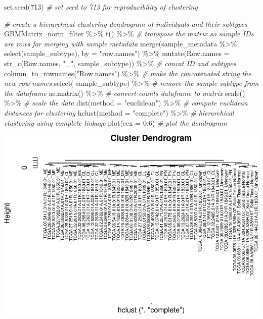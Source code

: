 \documentclass[
]{article}
\newenvironment{Shaded}{\begin{snugshade}}{\end{snugshade}}
\newcommand{\AttributeTok}[1]{\textcolor[rgb]{0.77,0.63,0.00}{#1}}
\newcommand{\CommentTok}[1]{\textcolor[rgb]{0.56,0.35,0.01}{\textit{#1}}}
\newcommand{\DecValTok}[1]{\textcolor[rgb]{0.00,0.00,0.81}{#1}}
\newcommand{\FloatTok}[1]{\textcolor[rgb]{0.00,0.00,0.81}{#1}}
\newcommand{\FunctionTok}[1]{\textcolor[rgb]{0.00,0.00,0.00}{#1}}
\newcommand{\NormalTok}[1]{#1}
\newcommand{\SpecialCharTok}[1]{\textcolor[rgb]{0.00,0.00,0.00}{#1}}
\newcommand{\StringTok}[1]{\textcolor[rgb]{0.31,0.60,0.02}{#1}}
\begin{document}
\begin{Shaded}
\begin{Highlighting}[]
\FunctionTok{set.seed}\NormalTok{(}\DecValTok{713}\NormalTok{) }\CommentTok{\# set seed to 713 for reproducibility of clustering}

\CommentTok{\# create a hierarchical clustering dendrogram of individuals and their subtypes}
\NormalTok{GBMMatrix\_norm\_filter }\SpecialCharTok{\%\textgreater{}\%} 
  \FunctionTok{t}\NormalTok{() }\SpecialCharTok{\%\textgreater{}\%} \CommentTok{\# transpose the matrix so sample IDs are rows for merging with sample metadata}
  \FunctionTok{merge}\NormalTok{(sample\_metadata }\SpecialCharTok{\%\textgreater{}\%} \FunctionTok{select}\NormalTok{(sample\_subtype), }\AttributeTok{by =} \StringTok{"row.names"}\NormalTok{) }\SpecialCharTok{\%\textgreater{}\%}
  \FunctionTok{mutate}\NormalTok{(}\AttributeTok{Row.names =} \FunctionTok{str\_c}\NormalTok{(Row.names, }\StringTok{"\_"}\NormalTok{, sample\_subtype)) }\SpecialCharTok{\%\textgreater{}\%} \CommentTok{\# concat ID and subtypes}
  \FunctionTok{column\_to\_rownames}\NormalTok{(}\StringTok{"Row.names"}\NormalTok{) }\SpecialCharTok{\%\textgreater{}\%} \CommentTok{\# make the concatenated string the new row names}
  \FunctionTok{select}\NormalTok{(}\SpecialCharTok{{-}}\NormalTok{sample\_subtype) }\SpecialCharTok{\%\textgreater{}\%} \CommentTok{\# remove the sample subtype from the dataframe}
  \FunctionTok{as.matrix}\NormalTok{() }\SpecialCharTok{\%\textgreater{}\%} \CommentTok{\# convert counts dataframe to matrix}
  \FunctionTok{scale}\NormalTok{() }\SpecialCharTok{\%\textgreater{}\%} \CommentTok{\# scale the data}
  \FunctionTok{dist}\NormalTok{(}\AttributeTok{method =} \StringTok{"euclidean"}\NormalTok{) }\SpecialCharTok{\%\textgreater{}\%} \CommentTok{\# compute euclidean distances for clustering}
  \FunctionTok{hclust}\NormalTok{(}\AttributeTok{method =} \StringTok{"complete"}\NormalTok{) }\SpecialCharTok{\%\textgreater{}\%} \CommentTok{\# hierarchical clustering using complete linkage}
  \FunctionTok{plot}\NormalTok{(}\AttributeTok{cex =} \FloatTok{0.6}\NormalTok{) }\CommentTok{\# plot the dendrogram}
\end{Highlighting}
\end{Shaded}

\includegraphics{LiuKevin_Final_Project_files/figure-latex/unnamed-chunk-15-1.pdf}
\end{document}
